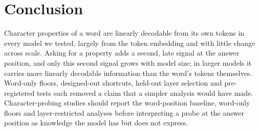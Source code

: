 \section{Conclusion}
\label{sec:conclusion}

Character properties of a word are linearly decodable from its own tokens in every model we tested,
largely from the token embedding and with little change across scale. Asking for a property adds a
second, late signal at the answer position, and only this second signal grows with model size; in
larger models it carries more linearly decodable information than the word's tokens themselves. Word-only
floors, designed-out shortcuts, held-out layer selection and pre-registered tests each removed a
claim that a simpler analysis would have made. Character-probing studies should report the
word-position baseline, word-only floors and layer-restricted analyses before interpreting a probe at
the answer position as knowledge the model has but does not express.
